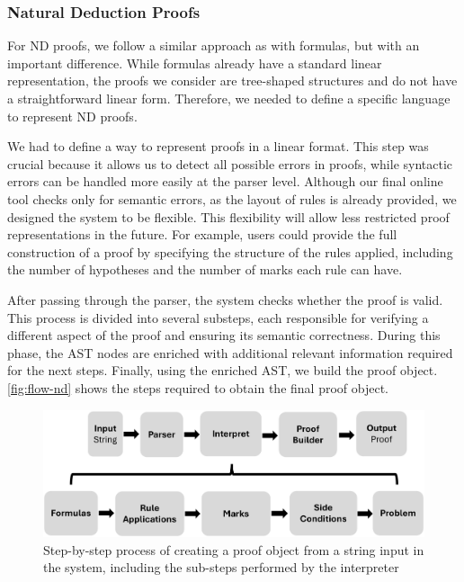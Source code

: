 \subsubsection{Natural Deduction Proofs}
For \gls{ND} proofs, we follow a similar approach as with formulas, but with an important difference. While formulas already have a standard linear representation, the proofs we consider are tree-shaped structures and do not have a straightforward linear form. Therefore, we needed to define a specific language to represent \gls{ND} proofs.

We had to define a way to represent proofs in a linear format. This step was crucial because it allows us to detect all possible errors in proofs, while syntactic errors can be handled more easily at the parser level. Although our final online tool checks only for semantic errors, as the layout of rules is already provided, we designed the system to be flexible. This flexibility will allow less restricted proof representations in the future. For example, users could provide the full construction of a proof by specifying the structure of the rules applied, including the number of hypotheses and the number of marks each rule can have.

After passing through the parser, the system checks whether the proof is valid. This process is divided into several substeps, each responsible for verifying a different aspect of the proof and ensuring its semantic correctness. During this phase, the \gls{AST} nodes are enriched with additional relevant information required for the next steps. Finally, using the enriched \gls{AST}, we build the proof object. \autoref{fig:flow-nd} shows the steps required to obtain the final proof object.

\begin{figure}[h]
    \centering
    \includegraphics[width=0.95\linewidth]{Chapters/Figures/nd-flow2.png}
    \caption{Step-by-step process of creating a proof object from a string input in the system, including the sub-steps performed by the interpreter}
    \label{fig:flow-nd}
\end{figure}

